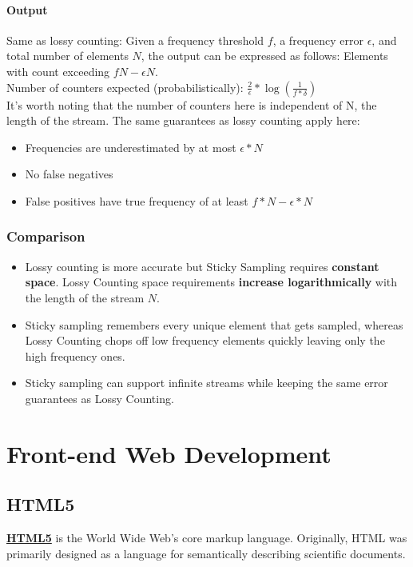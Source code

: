 \documentclass[a3paper, 12pt]{book} %
\begin{document}
\subsection{Output}
Same as lossy counting: Given a frequency threshold $f$, a frequency error $\epsilon$, and total number of elements $N$, the output can be expressed as follows: Elements with count exceeding $fN - \epsilon N$. \\

Number of counters expected (probabilistically): $\frac{2}{\epsilon}*\log{(\frac{1}{f*\delta})}$ \\

It's worth noting that the number of counters here is independent of N, the length of the stream. The same guarantees as lossy counting apply here:
\begin{itemize}
	\item Frequencies are underestimated by at most $\epsilon * N$
	\item No false negatives
	\item False positives have true frequency of at least $f*N - \epsilon*N$
\end{itemize}

\section{Comparison}
\begin{itemize}
	\item Lossy counting is more accurate but Sticky Sampling requires \textbf{constant space}. Lossy Counting space requirements \textbf{increase logarithmically} with the length of the stream $N$.
	\item Sticky sampling remembers every unique element that gets sampled, whereas Lossy Counting chops off low frequency elements quickly leaving only the high frequency ones.
	\item Sticky sampling can support infinite streams while keeping the same error guarantees as Lossy Counting.
\end{itemize}



\part{Front-end Web Development}
\chapter{HTML5}
\href{https://www.w3.org/TR/html5/introduction.html#a-quick-introduction-to-html}{\textbf{HTML5}} is the World Wide Web's core markup language. Originally, HTML was primarily designed as a language for semantically describing scientific documents.







\end{document}
